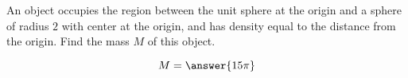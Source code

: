 \documentclass{ximera}
\author{David Guichard \and Neal Koblitz \and H. Jerome Keisler \and Albert Scheller \and Barry Balof \and Mike Wills \and Matthew Carr}
\begin{document}
\begin{exercise}




An object occupies the region between the unit sphere at the origin and a sphere of radius $2$ with center at the origin, and has density equal to the distance from the origin. Find the mass $M$ of this object. 
\begin{prompt}
\[
M=\answer{15\pi}
\]
\end{prompt}



\end{exercise}
\end{document}
